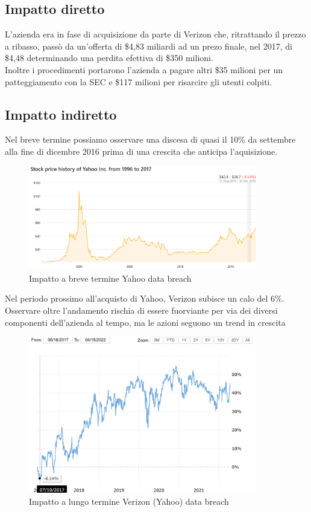 \documentclass[12pt,a4paper,openright,twoside]{report}
\begin{document}
\subsection{Impatto diretto}
L'azienda era in fase di acquisizione da parte di Verizon che, ritrattando il prezzo a ribasso, pass\`o da un'offerta di \$4,83 miliardi ad un prezo finale, nel 2017, di \$4,48 determinando una perdita efettiva di \$350 milioni\cite{yahoo_book}.\\
Inoltre i procedimenti portarono l'azienda a pagare altri \$35 milioni per un patteggiamento con la SEC e \$117 milioni per risarcire gli utenti colpiti.\\
\subsection{Impatto indiretto}
Nel breve termine possiamo osservare una discesa di quasi il 10\% da settembre alla fine di dicembre 2016 prima di una crescita che anticipa l'aquisizione.\\
\begin{figure}[H] 
\begin{center} 
\includegraphics[width=10cm]{figures/yahoo_short.png} 
\caption[Grafico Yahoo short]{Impatto a breve termine Yahoo data breach}\label{fig:yahoo1}
\end{center}
\end{figure}

Nel periodo prossimo all'acquisto di Yahoo, Verizon subisce un calo del 6\%. Osservare oltre l'andamento rischia di essere fuorviante per via dei diversi componenti dell'azienda al tempo, ma le azioni seguono un trend in crescita\\
\begin{figure}[H] 
\begin{center} 
\includegraphics[width=10cm]{figures/yahoo-verizon-long.png} 
\caption[Grafico Verizon (Yahoo) long]{Impatto a lungo termine Verizon (Yahoo) data breach}\label{fig:yahoo2}
\end{center}
\end{figure}
\end{document}
